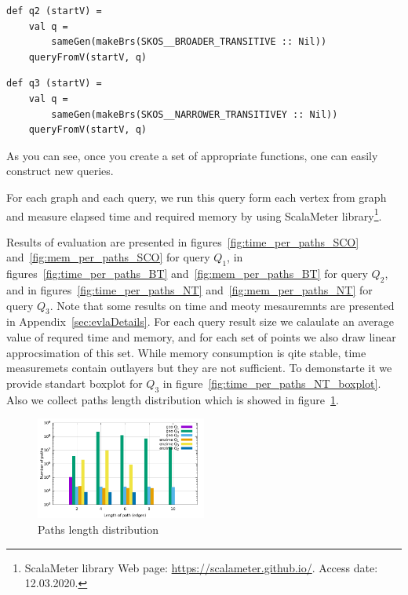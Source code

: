\begin{lstlisting}
def q2 (startV) =
    val q =
        sameGen(makeBrs(SKOS__BROADER_TRANSITIVE :: Nil))
    queryFromV(startV, q)
\end{lstlisting}

\begin{lstlisting}
def q3 (startV) =
    val q =
        sameGen(makeBrs(SKOS__NARROWER_TRANSITIVEY :: Nil))
    queryFromV(startV, q)
\end{lstlisting}

As you can see, once you create a set of appropriate functions, one can easily construct new queries.

For each graph and each query, we run this query form each vertex from graph and measure elapsed time and required memory by using ScalaMeter library\footnote{ScalaMeter library Web page: \url{https://scalameter.github.io/}. Access date: 12.03.2020.}.

Results of evaluation are presented in figures~\ref{fig:time_per_paths_SCO} and~\ref{fig:mem_per_paths_SCO} for query $Q_1$, in figures~\ref{fig:time_per_paths_BT} and~\ref{fig:mem_per_paths_BT} for query $Q_2$, and in figures~\ref{fig:time_per_paths_NT} and~\ref{fig:mem_per_paths_NT} for query $Q_3$. 
Note that some results on time and meoty mesauremnts are presented in Appendix~\ref{sec:evlaDetails}.
For each query result size we calaulate an average value of requred time and memory, and for each set of points we also draw linear approcsimation of this set. While memory consumption is qite stable, time measuremets contain outlayers but they are not sufficient. To demonstarte it we provide standart boxplot for $Q_3$ in figure~\ref{fig:time_per_paths_NT_boxplot}. 
Also we collect paths length distribution which is showed in figure~\ref{fig:pLength}.

\begin{figure}[ht]
  \begin{center}
    \includegraphics[width=0.5\textwidth]{data/path_per_length.pdf}
    \caption{Paths length distribution}\label{fig:pLength}
  \end{center}
\end{figure}

